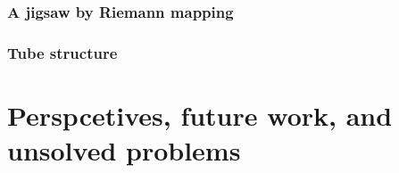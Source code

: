 \documentclass[aspectratio=169]{beamer}
\begin{document}
\begin{frame}
\frametitle{A jigsaw by Riemann mapping}
\begin{figure}[ht]\centering
{}
\end{figure}
\end{frame}

\begin{frame}
\frametitle{Tube structure}
\begin{figure}[ht]\centering
{}
\end{figure}
\end{frame}

\section{Perspcetives, future work, and unsolved problems}
\end{document}
